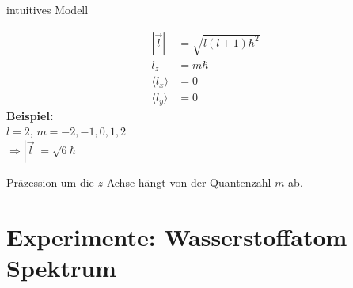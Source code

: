 
intuitives Modell

\begin{align*}
| \vec{l} | &= \sqrt{ l ( l+1) \hbar^2} \\
l_z &= m \hbar \\
\langle l_x \rangle &= 0 \\
\langle l_y \rangle &= 0
\end{align*}
\textbf{Beispiel:}\\
$ l=2 $, $ m = -2, -1, 0, 1, 2 $\\[5pt]
$ \Rightarrow |\vec{l}| = \sqrt{6}\hbar $


Präzession um die $ z $-Achse hängt von der Quantenzahl $ m $ ab.


\section{Experimente: Wasserstoffatom Spektrum}

